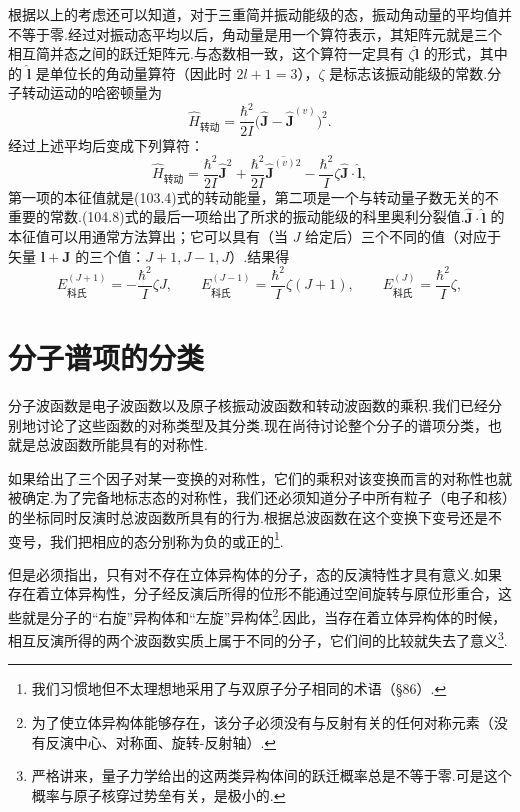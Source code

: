 根据以上的考虑还可以知道，对于三重简并振动能级的态，振动角动量的平均值并不等于零.经过对振动态平均以后，角动量是用一个算符表示，其矩阵元就是三个相互简并态之间的跃迁矩阵元.与态数相一致，这个算符一定具有 $\zeta\hat{\boldsymbol{l}}$ 的形式，其中的 $\hat{\boldsymbol{l}}$ 是单位长的角动量算符（因此时 $2l+1=3$），$\zeta$ 是标志该振动能级的常数.分子转动运动的哈密顿量为
\begin{equation*}
  \hat{H}_{\text{转动}}=\frac{\hbar^2}{2I}\big(\hat{\boldsymbol{J}}-\hat{\boldsymbol{J}}^{(v)}\big)^2.
\end{equation*}
经过上述平均后变成下列算符：
\begin{equation}
  \hat{H}_{\text{转动}}=\frac{\hbar^2}{2I}\hat{\boldsymbol{J}}^2
  +\frac{\hbar^2}{2I}\overline{\hat{\boldsymbol{J}}^{(v)2}}
  -\frac{\hbar^2}{I}\zeta\hat{\boldsymbol{J}}\cdot\hat{\boldsymbol{l}},
\end{equation}
第一项的本征值就是(103.4)式的转动能量，第二项是一个与转动量子数无关的不重要的常数.(104.8)式的最后一项给出了所求的振动能级的科里奥利分裂值.$\hat{\boldsymbol{J}}\cdot\hat{\boldsymbol{l}}$ 的本征值可以用通常方法算出；它可以具有（当 $J$ 给定后）三个不同的值（对应于矢量 $\boldsymbol{l}+\boldsymbol{J}$ 的三个值：$J+1,J-1,J$）.结果得
\begin{equation}
  E_{\text{科氏}}^{(J+1)}=-\frac{\hbar^2}{I}\zeta J,\qquad
  E_{\text{科氏}}^{(J-1)}=\frac{\hbar^2}{I}\zeta(J+1),\qquad
  E_{\text{科氏}}^{(J)}=\frac{\hbar^2}{I}\zeta,
\end{equation}

\section{分子谱项的分类}

分子波函数是电子波函数以及原子核振动波函数和转动波函数的乘积.我们已经分别地讨论了这些函数的对称类型及其分类.现在尚待讨论整个分子的谱项分类，也就是总波函数所能具有的对称性.

如果给出了三个因子对某一变换的对称性，它们的乘积对该变换而言的对称性也就被确定.为了完备地标志态的对称性，我们还必须知道分子中所有粒子（电子和核）的坐标同时反演时总波函数所具有的行为.根据总波函数在这个变换下变号还是不变号，我们把相应的态分别称为负的或正的\footnote{我们习惯地但不太理想地采用了与双原子分子相同的术语（§86）.}.

但是必须指出，只有对不存在立体异构体的分子，态的反演特性才具有意义.如果存在着立体异构性，分子经反演后所得的位形不能通过空间旋转与原位形重合，这些就是分子的“右旋”异构体和“左旋”异构体\footnote{为了使立体异构体能够存在，该分子必须没有与反射有关的任何对称元素（没有反演中心、对称面、旋转-反射轴）.}.因此，当存在着立体异构体的时候，相互反演所得的两个波函数实质上属于不同的分子，它们间的比较就失去了意义\footnote{严格讲来，量子力学给出的这两类异构体间的跃迁概率总是不等于零.可是这个概率与原子核穿过势垒有关，是极小的.}.


